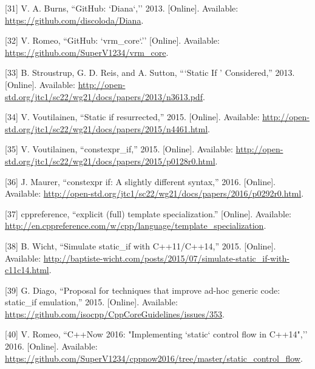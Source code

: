 \documentclass[twoside, 12pt, a4paper, openany]{book}
\begin{document}
\hypertarget{ref-github_diana}{}
{[}31{]} V. A. Burns, ``GitHub: `Diana`,'' 2013. {[}Online{]}.
Available: \url{https://github.com/discoloda/Diana}.

\hypertarget{ref-github_vrmcore}{}
{[}32{]} V. Romeo, ``GitHub: `vrm\_core`.'' {[}Online{]}. Available:
\url{https://github.com/SuperV1234/vrm_core}.

\hypertarget{ref-isocpp_sif0}{}
{[}33{]} B. Stroustrup, G. D. Reis, and A. Sutton, ```Static If '
Considered,'' 2013. {[}Online{]}. Available:
\url{http://open-std.org/jtc1/sc22/wg21/docs/papers/2013/n3613.pdf}.

\hypertarget{ref-isocpp_sif1}{}
{[}34{]} V. Voutilainen, ``Static if resurrected,'' 2015. {[}Online{]}.
Available:
\url{http://open-std.org/jtc1/sc22/wg21/docs/papers/2015/n4461.html}.

\hypertarget{ref-isocpp_sif2}{}
{[}35{]} V. Voutilainen, ``constexpr\_if,'' 2015. {[}Online{]}.
Available:
\url{http://open-std.org/jtc1/sc22/wg21/docs/papers/2015/p0128r0.html}.

\hypertarget{ref-isocpp_sif3}{}
{[}36{]} J. Maurer, ``constexpr if: A slightly different syntax,'' 2016.
{[}Online{]}. Available:
\url{http://open-std.org/jtc1/sc22/wg21/docs/papers/2016/p0292r0.html}.

\hypertarget{ref-cppreference_ets}{}
{[}37{]} cppreference, ``explicit (full) template specialization.''
{[}Online{]}. Available:
\url{http://en.cppreference.com/w/cpp/language/template_specialization}.

\hypertarget{ref-sif0}{}
{[}38{]} B. Wicht, ``Simulate static\_if with C++11/C++14,'' 2015.
{[}Online{]}. Available:
\url{http://baptiste-wicht.com/posts/2015/07/simulate-static_if-with-c11c14.html}.

\hypertarget{ref-sif1}{}
{[}39{]} G. Diago, ``Proposal for techniques that improve ad-hoc generic
code: static\_if emulation,'' 2015. {[}Online{]}. Available:
\url{https://github.com/isocpp/CppCoreGuidelines/issues/353}.

\hypertarget{ref-sif2}{}
{[}40{]} V. Romeo, ``C++Now 2016: "Implementing `static` control flow in
C++14",'' 2016. {[}Online{]}. Available:
\url{https://github.com/SuperV1234/cppnow2016/tree/master/static_control_flow}.
\end{document}
